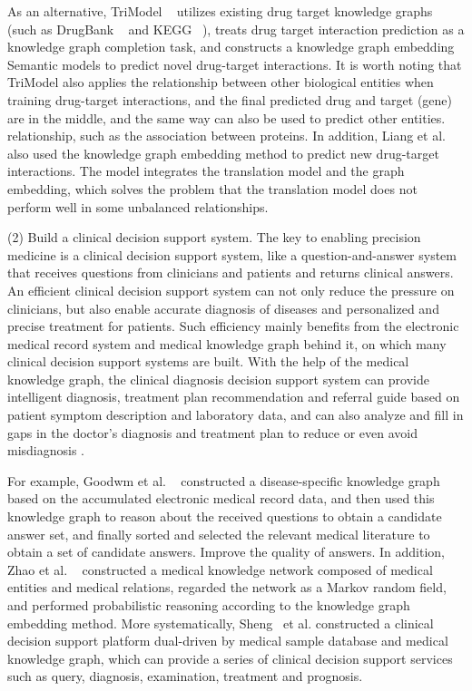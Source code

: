 As an alternative, TriModel ~\cite{2019Discovering} utilizes existing drug target knowledge graphs (such as DrugBank ~\cite{2017DrugBank} and KEGG ~\cite{2017KEGG}), treats drug target interaction prediction as a knowledge graph completion task, and constructs a knowledge graph embedding Semantic models to predict novel drug-target interactions. It is worth noting that TriModel also applies the relationship between other biological entities when training drug-target interactions, and the final predicted drug and target (gene) are in the middle, and the same way can also be used to predict other entities. relationship, such as the association between proteins. In addition, Liang et al. ~\cite{2019Predicting} also used the knowledge graph embedding method to predict new drug-target interactions. The model integrates the translation model and the graph embedding, which solves the problem that the translation model does not perform well in some unbalanced relationships.

(2) Build a clinical decision support system. The key to enabling precision medicine is a clinical decision support system, like a question-and-answer system that receives questions from clinicians and patients and returns clinical answers. An efficient clinical decision support system can not only reduce the pressure on clinicians, but also enable accurate diagnosis of diseases and personalized and precise treatment for patients. Such efficiency mainly benefits from the electronic medical record system and medical knowledge graph behind it, on which many clinical decision support systems are built. With the help of the medical knowledge graph, the clinical diagnosis decision support system can provide intelligent diagnosis, treatment plan recommendation and referral guide based on patient symptom description and laboratory data, and can also analyze and fill in gaps in the doctor's diagnosis and treatment plan to reduce or even avoid misdiagnosis .

For example, Goodwm et al. ~\cite{2016Medical} constructed a disease-specific knowledge graph based on the accumulated electronic medical record data, and then used this knowledge graph to reason about the received questions to obtain a candidate answer set, and finally sorted and selected the relevant medical literature to obtain a set of candidate answers. Improve the quality of answers. In addition, Zhao et al. ~\cite{2018EMR} constructed a medical knowledge network composed of medical entities and medical relations, regarded the network as a Markov random field, and performed probabilistic reasoning according to the knowledge graph embedding method. More systematically, Sheng~\cite{2018A} et al. constructed a clinical decision support platform dual-driven by medical sample database and medical knowledge graph, which can provide a series of clinical decision support services such as query, diagnosis, examination, treatment and prognosis.

